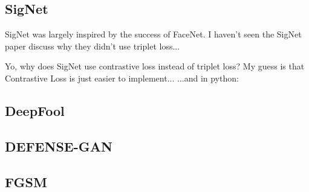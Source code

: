 \subsection{SigNet}
SigNet was largely inspired by the success of FaceNet.
I haven't seen the SigNet paper discuss why they didn't use triplet loss...

Yo, why does SigNet use contrastive loss instead of triplet loss?
    My guess is that Contrastive Loss is just easier to implement...
\cite{sig_net}
\cite{GitHub_sounakdey}
...and in python: \cite{GitHub_signet_pytorch}

\subsection{DeepFool}
\subsection{DEFENSE-GAN}

\subsection{FGSM}


